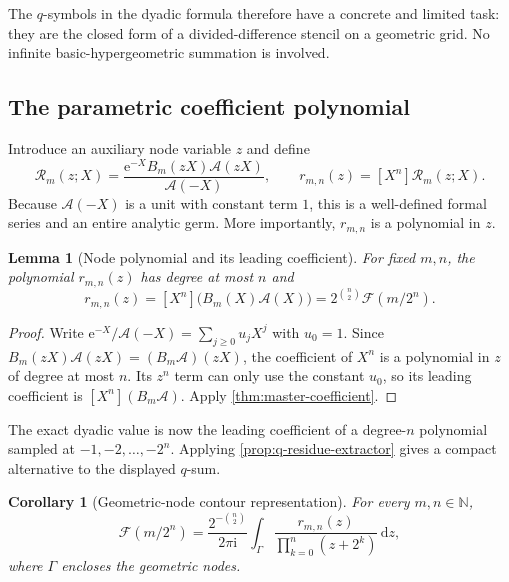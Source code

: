 \documentclass[11pt,oneside]{article}
\newtheorem{lemma}[theorem]{Lemma}
\newtheorem{corollary}[theorem]{Corollary}
\theoremstyle{definition}
\theoremstyle{remark}
\newcommand{\N}{\mathbb N}
\newcommand{\e}{\mathrm e}
\newcommand{\ii}{\mathrm i}
\newcommand{\dd}{\,\mathrm d}
\begin{document}
The $q$-symbols in the dyadic formula therefore have a concrete and limited task: they are the
closed form of a divided-difference stencil on a geometric grid.  No infinite
basic-hypergeometric summation is involved.

\subsection{The parametric coefficient polynomial}

Introduce an auxiliary node variable $z$ and define
\begin{equation}
 \mathscr R_m(z;X)
 =\frac{\e^{-X}B_m(zX)\mathscr A(zX)}{\mathscr A(-X)},
 \qquad
 r_{m,n}(z)=[X^n]\mathscr R_m(z;X).                        \label{eq:Rmn-def}
\end{equation}
Because $\mathscr A(-X)$ is a unit with constant term $1$, this is a well-defined formal
series and an entire analytic germ.  More importantly, $r_{m,n}$ is a polynomial in $z$.

\begin{lemma}[Node polynomial and its leading coefficient]
\label{lem:Rmn-leading}
For fixed $m,n$, the polynomial $r_{m,n}(z)$ has degree at most $n$ and
\begin{equation}
 [z^n]r_{m,n}(z)=[X^n]\bigl(B_m(X)\mathscr A(X)\bigr)
 =2^{\binom n2}\mathcal F(m/2^n).                         \label{eq:Rmn-leading}
\end{equation}
\end{lemma}

\begin{proof}
Write
\(
 \e^{-X}/\mathscr A(-X)=\sum_{j\ge0}u_jX^j
\)
with $u_0=1$.  Since
$B_m(zX)\mathscr A(zX)=(B_m\mathscr A)(zX)$, the coefficient of $X^n$ is a polynomial in $z$
of degree at most $n$.  Its $z^n$ term can only use the constant $u_0$, so its leading
coefficient is $[X^n](B_m\mathscr A)$.  Apply \cref{thm:master-coefficient}.
\end{proof}

The exact dyadic value is now the leading coefficient of a degree-$n$ polynomial sampled at
$-1,-2,\ldots,-2^n$.  Applying \cref{prop:q-residue-extractor} gives a compact alternative
to the displayed $q$-sum.

\begin{corollary}[Geometric-node contour representation]
\label{cor:q-node-contour}
For every $m,n\in\N$,
\begin{equation}
 \boxed{
 \mathcal F(m/2^n)=
 \frac{2^{-\binom n2}}{2\pi\ii}
 \int_\Gamma
 \frac{r_{m,n}(z)}{\prod_{k=0}^{n}(z+2^k)}\dd z,}          \label{eq:q-node-contour}
\end{equation}
where $\Gamma$ encloses the geometric nodes.
\end{corollary}
\end{document}
